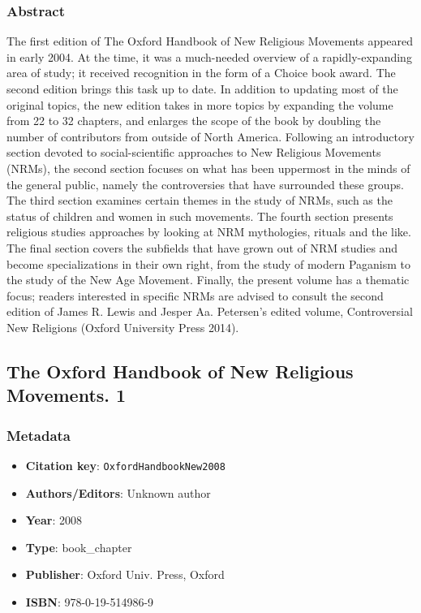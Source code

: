 \subsubsection*{Abstract}
The first edition of The Oxford Handbook of New Religious Movements appeared in early 2004. At the time, it was a much-needed overview of a rapidly-expanding area of study; it received recognition in the form of a Choice book award. The second edition brings this task up to date. In addition to updating most of the original topics, the new edition takes in more topics by expanding the volume from 22 to 32 chapters, and enlarges the scope of the book by doubling the number of contributors from outside of North America. Following an introductory section devoted to social-scientific approaches to New Religious Movements (NRMs), the second section focuses on what has been uppermost in the minds of the general public, namely the controversies that have surrounded these groups. The third section examines certain themes in the study of NRMs, such as the status of children and women in such movements. The fourth section presents religious studies approaches by looking at NRM mythologies, rituals and the like. The final section covers the subfields that have grown out of NRM studies and become specializations in their own right, from the study of modern Paganism to the study of the New Age Movement. Finally, the present volume has a thematic focus; readers interested in specific NRMs are advised to consult the second edition of James R. Lewis and Jesper Aa. Petersen’s edited volume, Controversial New Religions (Oxford University Press 2014).

\subsection{The Oxford Handbook of New Religious Movements. 1}\label{lit:OxfordHandbookNew2008}
\subsubsection*{Metadata}
\begin{itemize}
  \item \textbf{Citation key}: \texttt{OxfordHandbookNew2008}
  \item \textbf{Authors/Editors}: Unknown author
  \item \textbf{Year}: 2008
  \item \textbf{Type}: book\_chapter
  \item \textbf{Publisher}: Oxford Univ. Press, Oxford
  \item \textbf{ISBN}: 978-0-19-514986-9
\end{itemize}

